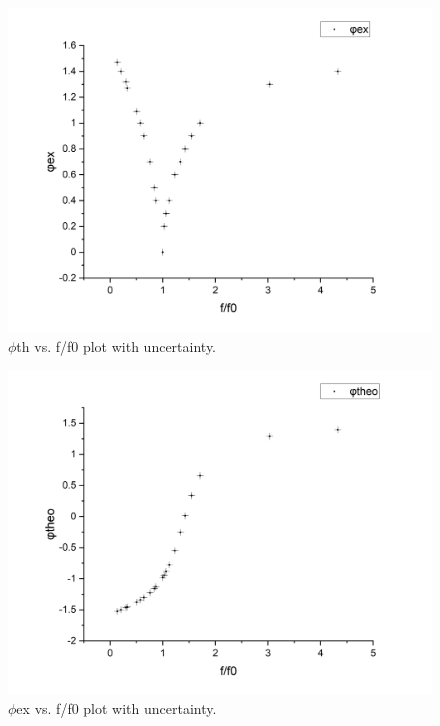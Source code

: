 \documentclass[12pt,a4paper]{article}
\begin{document}
\begin{figure}[H]
    \centering
    \includegraphics[scale=0.4]{4.jpg}
    \caption{$\phi$th vs. f/f0 plot with uncertainty.}
    \label{th vs. f/f0 plot with uncertainty.}
\end{figure}
\begin{figure}[H]
    \centering
    \includegraphics[scale=0.4]{5.jpg}
    \caption{$\phi$ex vs. f/f0 plot with uncertainty.}
    \label{ex vs. f/f0 plot with uncertainty.}
\end{figure}
\end{document}
